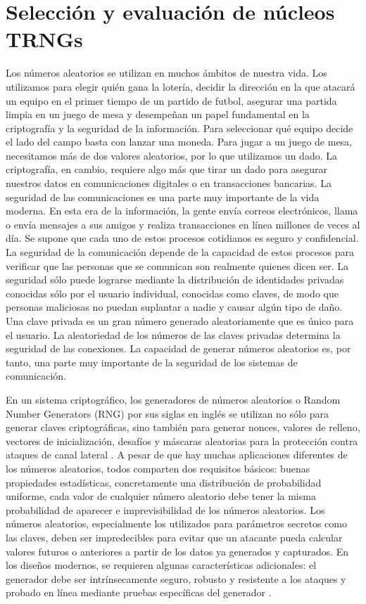 \chapter{Selección y evaluación de núcleos TRNGs}		


	Los números aleatorios se utilizan en muchos ámbitos de nuestra vida. Los utilizamos para elegir quién gana la lotería, decidir la dirección en la que atacará un equipo en el primer tiempo de un partido de futbol, asegurar una partida limpia en un juego de mesa y desempeñan un papel fundamental en la criptografía y la seguridad de la información. Para seleccionar qué equipo decide el lado del campo basta con lanzar una moneda. Para jugar a un juego de mesa, necesitamos más de dos valores aleatorios, por lo que utilizamos un dado. La criptografía, en cambio, requiere algo más que tirar un dado para asegurar nuestros datos en comunicaciones digitales o en transacciones bancarias. La seguridad de las comunicaciones es una parte muy importante de la vida moderna. En esta era de la información, la gente envía correos electrónicos, llama o envía mensajes a sus amigos y realiza transacciones en línea millones de veces al día. Se supone que cada uno de estos procesos cotidianos es seguro y confidencial. La seguridad de la comunicación depende de la capacidad de estos procesos para verificar que las personas que se comunican son realmente quienes dicen ser. La seguridad sólo puede lograrse mediante la distribución de identidades privadas conocidas sólo por el usuario individual, conocidas como claves, de modo que personas maliciosas no puedan suplantar a nadie y causar algún tipo de daño. Una clave privada es un gran número generado aleatoriamente que es único para el usuario. La aleatoriedad de los números de las claves privadas determina la seguridad de las conexiones. La capacidad de generar números aleatorios es, por tanto, una parte muy importante de la seguridad de los sistemas de comunicación.

	En un sistema criptográfico, los generadores de números aleatorios o Random Number Generators (RNG) por sus siglas en inglés se utilizan no sólo para generar claves criptográficas, sino también para generar nonces, valores de relleno, vectores de inicialización, desafíos y máscaras aleatorias para la protección contra ataques de canal lateral \cite{Petura2016}. A pesar de que hay muchas aplicaciones diferentes de los números aleatorios, todos comparten dos requisitos básicos: buenas propiedades estadísticas, concretamente una distribución de probabilidad uniforme, cada valor de cualquier número aleatorio debe tener la misma probabilidad de aparecer e imprevisibilidad de los números aleatorios. Los números aleatorios, especialmente los utilizados para parámetros secretos como las claves, deben ser impredecibles para evitar que un atacante pueda calcular valores futuros o anteriores a partir de los datos ya generados y capturados. En los diseños modernos, se requieren algunas características adicionales: el generador debe ser intrínsecamente seguro, robusto y resistente a los ataques y probado en línea mediante pruebas específicas del generador \cite{Badrignans2011}.
		
